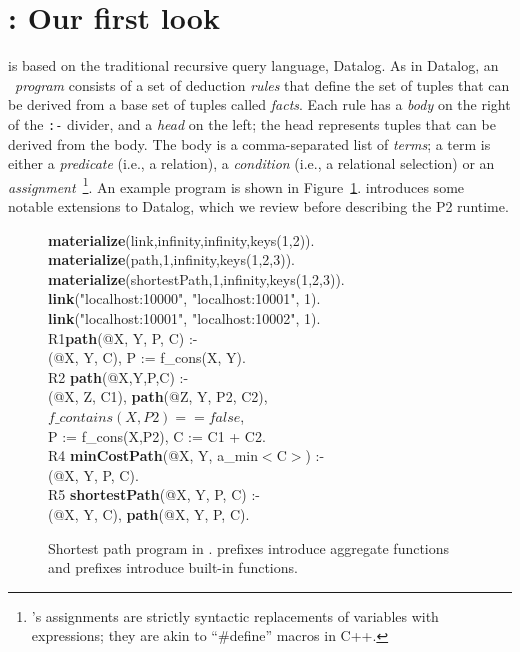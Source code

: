 \section{\OVERLOG: Our first look}
\label{ch:p2:sec:overlog}

\OVERLOG is based on the traditional recursive query language, Datalog.  As in
Datalog, an \OVERLOG~{\em program} consists of a set of deduction {\em rules}
that define the set of tuples that can be derived from a base set of tuples
called {\em facts}.  Each rule has a {\em body} on the right of the \texttt{:-}
divider, and a {\em head} on the left; the head represents tuples that can be
derived from the body.  The body is a comma-separated list of {\em terms}; a
term is either a {\em predicate} (i.e., a relation), a {\em condition} (i.e., a
relational selection) or an {\em assignment}~\footnote{\OVERLOG's assignments
are strictly syntactic replacements of variables with expressions; they are
akin to ``\#define'' macros in C++.}.  An example \OVERLOG program is shown in
Figure~\ref{ch:p2:fig:overlogSP}.  \OVERLOG introduces some notable extensions
to Datalog, which we review before describing the P2 runtime.

\begin{figure}
\ssp
\begin{boxedminipage}{\linewidth}
{\bf materialize}(link,infinity,infinity,keys(1,2)). \\
{\bf materialize}(path,1,infinity,keys(1,2,3)).  \\
{\bf materialize}(shortestPath,1,infinity,keys(1,2,3)). \\

{\bf link}("localhost:10000", "localhost:10001", 1). \\
{\bf link}("localhost:10001", "localhost:10002", 1). \\

R1{\bf path}(@X, Y, P, C) :- \\
(@X, Y, C), P := f\_cons(X, Y). \\

R2 {\bf path}(@X,Y,P,C) :- \\
(@X, Z, C1), {\bf path}(@Z, Y, P2, C2), \\
\datalogspace $f\_contains(X,P2) == false$, \\
\datalogspace P := f\_cons(X,P2), C := C1 + C2. \\ 

R4 {\bf minCostPath}(@X, Y, a\_min$<$C$>$) :-  \\
(@X, Y, P, C). \\

R5 {\bf shortestPath}(@X, Y, P, C) :- \\
(@X, Y, C), {\bf path}(@X, Y, P, C).\\
\end{boxedminipage}
\caption{\label{ch:p2:fig:overlogSP}Shortest path program in \OVERLOG. 
prefixes introduce aggregate functions and  prefixes introduce
built-in functions.}
\end{figure}

